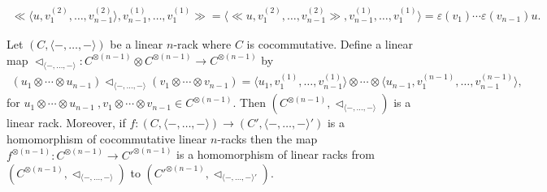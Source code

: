 \documentclass[10pt,a4paper]{amsart}
\begin{document}
    \begin{align}\label{inv-prop}
        \ll \langle u, v_1^{(2)}, \ldots, v_{n-1}^{(2)} \rangle, v_{n-1}^{(1)}, \ldots, v_1^{(1)} \gg = \langle \ll u, v_1^{(2)}, \ldots, v_{n-1}^{(2)} \gg , v_{n-1}^{(1)}, \ldots, v_1^{(1)} \rangle = \varepsilon (v_1) \cdots \varepsilon (v_{n-1}) u.
    \end{align}

\begin{thm}\label{thm-linn-lin}
    Let $(C, \langle -, \ldots , - \rangle)$ be a linear $n$-rack where $C$ is cocommutative. Define a linear map $\triangleleft_{ \langle -, \ldots , - \rangle} : C^{\otimes (n-1)} \otimes C^{\otimes (n-1)} \rightarrow C^{\otimes (n-1)}$ by
    \begin{align}\label{first-n}
        (u_1 \otimes \cdots \otimes u_{n-1}) \triangleleft_{ \langle -, \ldots , - \rangle} (v_1 \otimes \cdots \otimes v_{n-1}) = \langle u_1 , v_1^{(1)}, \ldots, v_{n-1}^{(1)}   \rangle \otimes \cdots \otimes \langle u_{n-1} , v_1^{(n-1)}, \ldots, v_{n-1}^{(n-1)} \rangle,
    \end{align}
    for $u_1 \otimes \cdots \otimes u_{n-1} ~ \! ,  v_1 \otimes \cdots \otimes v_{n-1} \in C^{\otimes (n-1)}$. Then $(C^{\otimes (n-1)}, \triangleleft_{ \langle -, \ldots , - \rangle} ) $ is a linear rack. Moreover, if $f : (C, \langle -, \ldots , - \rangle) \rightarrow (C', \langle -, \ldots , - \rangle')$ is a homomorphism of cocommutative linear $n$-racks then the map $f^{\otimes (n-1)} : C^{\otimes (n-1)} \rightarrow C'^{\otimes (n-1)}$ is a homomorphism of linear racks from $(C^{\otimes (n-1)}, \triangleleft_{\langle -, \ldots , - \rangle })$ to $(C'^{\otimes (n-1)}, \triangleleft_{\langle -, \ldots , - \rangle' })$.
\end{thm}
\end{document}
